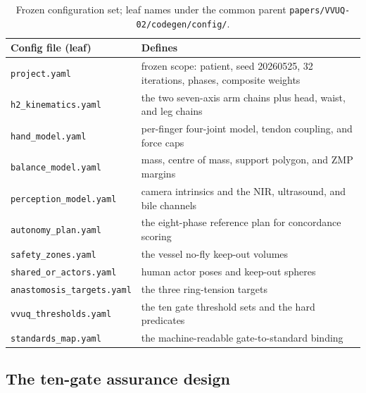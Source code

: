 \begin{table}[H]
\caption{Frozen configuration set; leaf names under the common parent
\texttt{papers/VVUQ-02/codegen/config/}.}
\label{tab:config}
\centering
\footnotesize
\begin{tabularx}{\textwidth}{L{4cm} Y}
\toprule
\textbf{Config file (leaf)} & \textbf{Defines} \\
\midrule
\texttt{project.yaml} & frozen scope: patient, seed 20260525, 32 iterations, phases, composite weights \\
\texttt{h2\_kinematics.yaml} & the two seven-axis arm chains plus head, waist, and leg chains \\
\texttt{hand\_model.yaml} & per-finger four-joint model, tendon coupling, and force caps \\
\texttt{balance\_model.yaml} & mass, centre of mass, support polygon, and ZMP margins \\
\texttt{perception\_model.yaml} & camera intrinsics and the NIR, ultrasound, and bile channels \\
\texttt{autonomy\_plan.yaml} & the eight-phase reference plan for concordance scoring \\
\texttt{safety\_zones.yaml} & the vessel no-fly keep-out volumes \\
\texttt{shared\_or\_actors.yaml} & human actor poses and keep-out spheres \\
\texttt{anastomosis\_targets.yaml} & the three ring-tension targets \\
\texttt{vvuq\_thresholds.yaml} & the ten gate threshold sets and the hard predicates \\
\texttt{standards\_map.yaml} & the machine-readable gate-to-standard binding \\
\bottomrule
\end{tabularx}
\end{table}

\subsection{The ten-gate assurance design}

